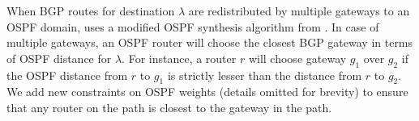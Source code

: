 %
%

When BGP routes for destination $\lambda$ 
are redistributed by multiple gateways to an 
OSPF domain, \name uses a modified OSPF synthesis
algorithm from .
In case of multiple gateways, an OSPF router will choose
the closest BGP gateway in terms of OSPF distance 
for $\lambda$. For instance, a router $r$ will choose
gateway $g_1$ over $g_2$ if the OSPF distance from $r$ to $g_1$ 
is strictly lesser than the distance from $r$ to $g_2$. 
We add new constraints on OSPF weights (details omitted for brevity) 
to ensure that any router on the path is closest to the gateway in the path.


